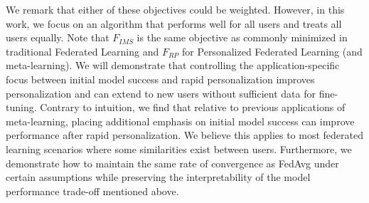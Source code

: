 We remark that either of these objectives could be weighted.
However, in this work, we focus on an algorithm that performs well for all users and treats all users equally. 
Note that $F_{IMS}$ is the same objective as commonly minimized in traditional Federated Learning and $F_{RP}$ for Personalized Federated Learning (and meta-learning). 
We will demonstrate that controlling the application-specific focus between initial model success and rapid personalization improves personalization and can extend to new users without sufficient data for fine-tuning.
Contrary to intuition, we find that relative to previous applications of meta-learning, placing additional emphasis on initial model success can improve performance after rapid personalization. 
We believe this applies to most federated learning scenarios where some similarities exist between users. 
Furthermore, we demonstrate how to maintain the same rate of convergence as FedAvg under certain assumptions while preserving the interpretability of the model performance trade-off mentioned above. 

